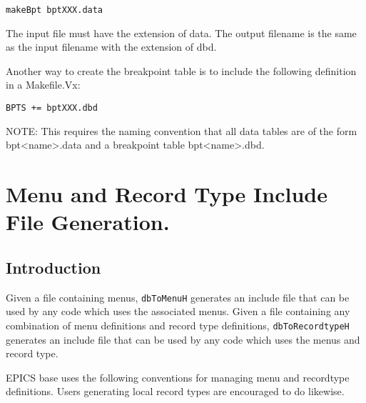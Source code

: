 \begin{verbatim}makeBpt bptXXX.data
\end{verbatim}The input file must have the extension of data. The output filename is the same as the input filename with the extension of 
dbd.

Another way to create the breakpoint table is to include the following definition in a Makefile.Vx:

\begin{verbatim}BPTS += bptXXX.dbd
\end{verbatim}NOTE: This requires the naming convention that all data tables are of the form bpt\textless{}name\textgreater{}.data and a breakpoint table 
bpt\textless{}name\textgreater{}.dbd.

\section{Menu and Record Type Include File Generation.}

\subsection{Introduction}

Given a file containing menus, \verb|dbToMenuH| generates an include file that can be used by any code which uses the 
associated menus. Given a file containing any combination of menu definitions and record type definitions, 
\verb|dbToRecordtypeH| generates an include file that can be used by any code which uses the menus and record type.

EPICS base uses the following conventions for managing menu and recordtype definitions. Users generating local record 
types are encouraged to do likewise.

